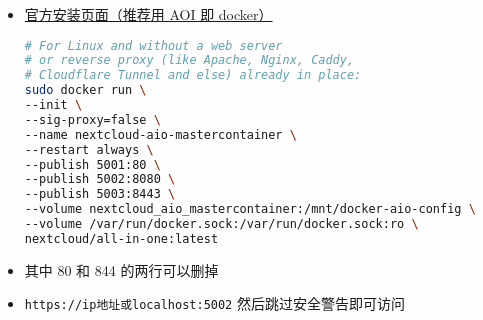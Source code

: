 
\begin{itemize}
\item \href{https://nextcloud.com/install/}{官方安装页面（推荐用 AOI 即 docker）}
\begin{lstlisting}[language=bash]
# For Linux and without a web server
# or reverse proxy (like Apache, Nginx, Caddy,
# Cloudflare Tunnel and else) already in place:
sudo docker run \
--init \
--sig-proxy=false \
--name nextcloud-aio-mastercontainer \
--restart always \
--publish 5001:80 \
--publish 5002:8080 \
--publish 5003:8443 \
--volume nextcloud_aio_mastercontainer:/mnt/docker-aio-config \
--volume /var/run/docker.sock:/var/run/docker.sock:ro \
nextcloud/all-in-one:latest
\end{lstlisting}
\item 其中 80 和 844 的两行可以删掉
\item \verb`https://ip地址或localhost:5002` 然后跳过安全警告即可访问
\end{itemize}
